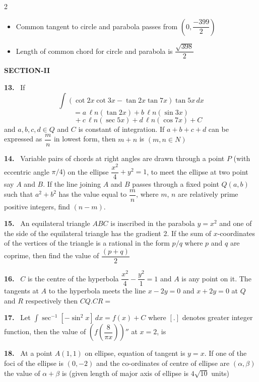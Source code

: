 \documentclass[10pt]{extarticle}
\newcommand{\sect}[1]{\par\smallskip\noindent\textbf{#1}\par}
\newcommand{\qn}[1]{\par\smallskip\noindent\textbf{#1.}~}
\newenvironment{qoptions}{\begin{itemize}[leftmargin=1.8em,itemsep=1pt,topsep=2pt,label={}]}{\end{itemize}}
\newcommand{\opt}[2]{\item[(#1)] #2}
\begin{document}
\begin{multicols}{2}
\begin{qoptions}
\opt{C}{Common tangent to circle and parabola passes from $\left(0,\dfrac{-399}2\right)$}
\opt{D}{Length of common chord for circle and parabola is $\dfrac{\sqrt{398}}2$}
\end{qoptions}
\sect{SECTION-II}
\qn{13} If {\small\[\int(\cot2x\cot3x-\tan2x\tan7x)\tan5x\,dx\]\[=a\,\ell n(\tan2x)+b\,\ell n(\sin3x)\]\[\qquad+c\,\ell n(\sec5x)+d\,\ell n(\cos7x)+C\]} and $a,b,c,d\in Q$ and $C$ is constant of integration. If $a+b+c+d$ can be expressed as $\dfrac mn$ in lowest form, then $m+n$ is $(m,n\in N)$
\qn{14} Variable pairs of chords at right angles are drawn through a point $P$ (with eccentric angle $\pi/4$) on the ellipse $\dfrac{x^2}4+y^2=1$, to meet the ellipse at two point say $A$ and $B$. If the line joining $A$ and $B$ passes through a fixed point $Q(a,b)$ such that $a^2+b^2$ has the value equal to $\dfrac mn$, where $m$, $n$ are relatively prime positive integers, find $(n-m)$.
\qn{15} An equilateral triangle $ABC$ is inscribed in the parabola $y=x^2$ and one of the side of the equilateral triangle has the gradient 2. If the sum of $x$-coordinates of the vertices of the triangle is a rational in the form $p/q$ where $p$ and $q$ are coprime, then find the value of $\dfrac{(p+q)}2$
\qn{16} $C$ is the centre of the hyperbola $\dfrac{x^2}4-\dfrac{y^2}1=1$ and $A$ is any point on it. The tangents at $A$ to the hyperbola meets the line $x-2y=0$ and $x+2y=0$ at $Q$ and $R$ respectively then $CQ.CR=$
\qn{17} Let $\displaystyle\int\sec^{-1}[-\sin^2x]\,dx=f(x)+C$ where $[.]$ denotes greater integer function, then the value of {\small$\left(f\left(\dfrac8{\pi x}\right)\right)''$} at $x=2$, is
\qn{18} At a point $A(1,1)$ on ellipse, equation of tangent is $y=x$. If one of the foci of the ellipse is $(0,-2)$ and the co-ordinates of centre of ellipse are $(\alpha,\beta)$ the value of $\alpha+\beta$ is (given length of major axis of ellipse is $4\sqrt{10}$ units)
\end{multicols}
\end{document}
